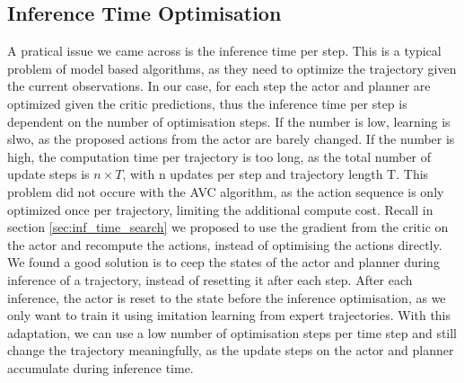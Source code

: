 \subsection{Inference Time Optimisation}
A pratical issue we came across is the inference time per step. This is a typical problem of model based algorithms, as they need to optimize the trajectory given 
the current observations. In our case, for each step the actor and planner are optimized given the critic predictions, thus the inference time 
per step is dependent on the number of optimisation steps. If the number is low, learning is slwo, as the proposed actions from the actor are barely changed. 
If the number is high, the computation time per trajectory is too long, as the total number of update steps is $n \times T$, with n updates per step and trajectory length 
T. This problem did not occure with the AVC algorithm, as the action sequence is only optimized 
once per trajectory, limiting the additional compute cost. Recall in section \ref{sec:inf_time_search} we proposed to use the gradient from the critic on the actor and recompute the 
actions, instead of optimising the actions directly. We found a good solution is to ceep the states of the actor and planner during inference of a trajectory, 
instead of resetting it after each step. After each inference, the actor is reset to the state before the inference optimisation, as we only want to 
train it using imitation learning from expert trajectories. With this adaptation, we can use a low number of optimisation steps per time step and still change the trajectory meaningfully, 
as the update steps on the actor and planner accumulate during inference time.
     
